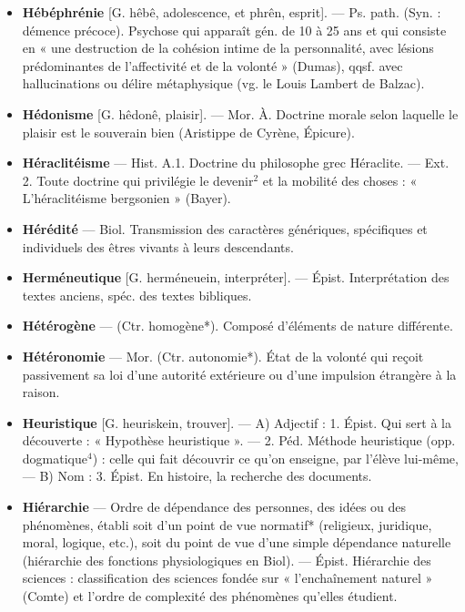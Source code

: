 \begin{itemize}[leftmargin=1cm, label=, itemsep=1pt]
\item {\bf Hébéphrénie} [G. hêbê, adolescence, et
phrên, esprit]. — Ps. path. (Syn. :
démence précoce). Psychose qui apparaît gén. de 10 à 25 ans et qui consiste en « une destruction de la cohésion intime de la personnalité, avec
lésions prédominantes de l’affectivité et de la volonté » (Dumas),
qqsf. avec hallucinations ou délire
métaphysique (vg. le Louis Lambert
de Balzac).

\item {\bf Hédonisme} [G. hêdonê, plaisir]. —
Mor. À. Doctrine morale selon laquelle le plaisir est le souverain
bien (Aristippe de Cyrène, Épicure).

\item {\bf Héraclitéisme} — Hist. A.1. Doctrine du
philosophe grec Héraclite. — Ext. 2.
Toute doctrine qui privilégie le
devenir$^2$ et la mobilité des choses :
«  L’héraclitéisme bergsonien »
(Bayer).

\item {\bf Hérédité} — Biol. Transmission des
caractères génériques, spécifiques et
individuels des êtres vivants à leurs
descendants.

\item {\bf Herméneutique} [G. herméneuein, interpréter]. — Épist. Interprétation des
textes anciens, spéc. des textes
bibliques.

\item {\bf Hétérogène} — (Ctr. homogène*).
Composé d’éléments de nature différente.

\item {\bf Hétéronomie} — Mor. (Ctr. autonomie*).
État de la volonté qui reçoit passivement sa loi d’une autorité extérieure ou d’une impulsion étrangère
à la raison.

\item {\bf Heuristique} [G. heuriskein, trouver].
— A) Adjectif : 1. Épist. Qui sert à
la découverte : « Hypothèse heuristique ». — 2. Péd. Méthode heuristique (opp. dogmatique$^4$) : celle qui
fait découvrir ce qu’on enseigne, par
l'élève lui-même, — B) Nom : 3.
Épist. En histoire, la recherche des
documents.

\item {\bf Hiérarchie} — Ordre de dépendance
des personnes, des idées ou des phénomènes, établi soit d’un point de
vue normatif* (religieux, juridique,
moral, logique, etc.), soit du point
de vue d’une simple dépendance
naturelle (hiérarchie des fonctions
physiologiques en Biol). — Épist.
Hiérarchie des sciences : classification des sciences fondée sur « l’enchaînement naturel » (Comte) et
l’ordre de complexité des phénomènes qu'elles étudient.


\end{itemize}
